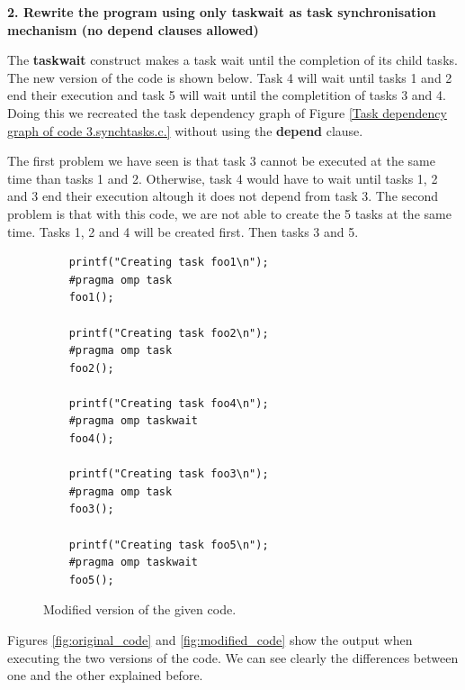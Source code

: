 \documentclass[12pt, a4paper]{article}
\begin{document}
\hfill

\textbf{2. Rewrite the program using only taskwait as task synchronisation mechanism (no depend clauses allowed)}

The \textbf{taskwait} construct makes a task wait until the completion of its child tasks. The new version of the code is shown below. Task 4 will wait until tasks 1 and 2 end their execution and task 5 will wait until the completition of tasks 3 and 4. Doing this we recreated the task dependency graph of Figure \ref{Task dependency graph of code 3.synchtasks.c.} without using the \textbf{depend} clause.

The first problem we have seen is that task 3 cannot be executed at the same time than tasks 1 and 2. Otherwise, task 4 would have to wait until tasks 1, 2 and 3 end their execution altough it does not depend from task 3. The second problem is that with this code, we are not able to create the 5 tasks at the same time. Tasks 1, 2 and 4 will be created first. Then tasks 3 and 5.

\begin{figure}[H]
	\begin{lstlisting}
	printf("Creating task foo1\n");
	#pragma omp task
	foo1();
	
	printf("Creating task foo2\n");
	#pragma omp task
	foo2();
	
	printf("Creating task foo4\n");
	#pragma omp taskwait
	foo4();

	printf("Creating task foo3\n");
	#pragma omp task
	foo3();
	
	printf("Creating task foo5\n");
	#pragma omp taskwait
	foo5();
	\end{lstlisting}
	
	\caption{Modified version of the given code.}
\end{figure}

Figures \ref{fig:original_code} and \ref{fig:modified_code} show the output when executing the two versions of the code. We can see clearly the differences between one and the other explained before.
\end{document}
